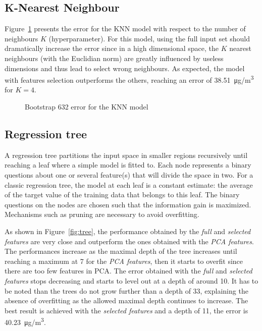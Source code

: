 \documentclass[journal,11pt]{IEEEtran}
\begin{document}
\subsection{K-Nearest Neighbour}

Figure~\ref{fig:KNN} presents the error for the KNN model with respect to the number of neighbours $K$ (hyperparameter). For this model, using the full input set should dramatically increase the error since in a high dimensional space, the $K$ nearest neighbours (with the Euclidian norm) are greatly influenced by useless dimensions and thus lead to select wrong neighbours. As expected, the model with features selection outperforms the others, reaching an error of \SI{38.51}{\micro g/m^3} for $K = 4$.


\begin{figure}[H]
    \centering
    
    \caption{Bootstrap 632 error for the KNN model}
    \label{fig:KNN}
\end{figure}


\subsection{Regression tree}

A regression tree partitions the input space in smaller regions recursively until reaching a leaf where a simple model is fitted to. Each node represents a binary questions about one or several feature(s) that will divide the space in two.  For a classic regression tree, the model at each leaf is a constant estimate: the average of the target value of the training data that belongs to this leaf. The binary questions on the nodes are chosen such that the information gain is maximized. Mechanisms such as pruning are necessary to avoid overfitting. 


As shown in Figure~\ref{fig:tree}, the performance obtained by the \textit{full} and \textit{selected features} are very close and outperform the ones obtained with the \textit{PCA features}. The performances increase as the maximal depth of the tree increases until reaching a maximum at 7 for the \textit{PCA features}, then it starts to overfit since there are too few features in PCA. The error obtained with the \textit{full} and \textit{selected features} stops decreasing and starts to level out at a depth of around 10. It has to be noted than the trees do not grow further than a depth of 33, explaining the absence of overfitting as the allowed maximal depth continues to increase. The best result is achieved with the \textit{selected features} and a depth of 11, the error is \SI{40.23}{\micro g/m^3}.
\end{document}

